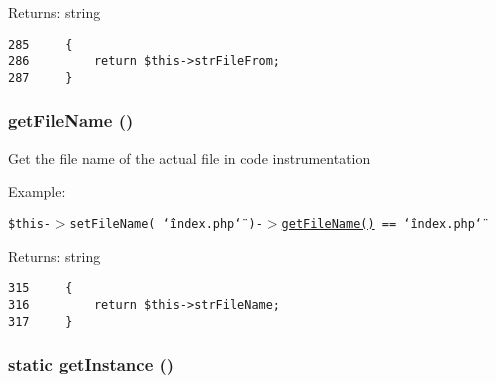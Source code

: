 \begin{Desc}
\item[Returns:]string \end{Desc}


\begin{Code}\begin{verbatim}285     {
286         return $this->strFileFrom;
287     }
\end{verbatim}
\end{Code}


\hypertarget{class_code_to_diagram_fdeebfe3fcf5806fc79c074a6a3a6eb1}{
\subsubsection[{getFileName}]{\setlength{\rightskip}{0pt plus 5cm}getFileName ()}}
\label{class_code_to_diagram_fdeebfe3fcf5806fc79c074a6a3a6eb1}


Get the file name of the actual file in code instrumentation

\begin{Desc}
\item[Example:]\end{Desc}
{\tt  \$this-$>$setFileName( \char`\"{}index.php\char`\"{} )-$>$\hyperlink{class_code_to_diagram_fdeebfe3fcf5806fc79c074a6a3a6eb1}{getFileName()} == \char`\"{}index.php\char`\"{} } \begin{Desc}
\item[Returns:]string \end{Desc}


\begin{Code}\begin{verbatim}315     {
316         return $this->strFileName;
317     }
\end{verbatim}
\end{Code}


\hypertarget{class_code_to_diagram_c93fbec81f07e5d15f80db907e63dc10}{
\subsubsection[{getInstance}]{\setlength{\rightskip}{0pt plus 5cm}static getInstance ()}}
\label{class_code_to_diagram_c93fbec81f07e5d15f80db907e63dc10}


